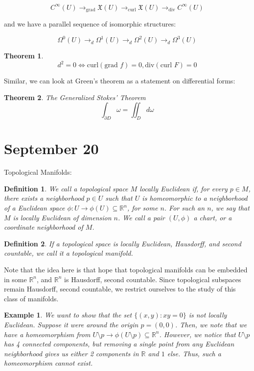 \documentclass[10pt]{article}
\newtheorem{definition}{Definition}[section]
\newtheorem{theorem}{Theorem}[section]
\newtheorem{example}{Example}[section]
\begin{document}
$$ C^\infty(U) \to_{\text{grad}} \mathfrak{X}(U) \to_{\text{curl}} \mathfrak{X}(U) \to_{\text{div}} C^\infty(U) $$

and we have a parallel sequence of isomorphic structures:

$$ \Omega^0(U) \to_d  \Omega^1(U) \to_d  \Omega^2(U) \to_d \Omega^3(U)$$

\begin{theorem}
$$d^2 = 0 \iff \text{curl}(\text{grad } f) = 0, \text{div}(\text{curl } F) = 0 $$
\end{theorem}

Similar, we can look at Green’s theorem as a statement on differential forms:

\begin{theorem}
The Generalized Stokes’ Theorem
$$ \int_{\partial D} \omega = \iint_D d\omega $$
\end{theorem}

\section{September 20}

Topological Manifolds:

\begin{definition}
We call a topological space $M$ locally Euclidean if, for every $p \in M$, there exists a neighborhood $p \in U$ such that $U$ is homeomorphic to a neighborhood of a Euclidean space $\phi: U \to \phi(U) \subseteq \mathbb{R}^n$, for some $n$. For such an $n$, we say that $M$ is locally Euclidean of dimension $n$. We call a pair $(U, \phi)$ a chart, or a coordinate neighborhood of $M$.
\end{definition}

\begin{definition}
If a topological space is locally Euclidean, Hausdorff, and second countable, we call it a topological manifold.
\end{definition}

Note that the idea here is that hope that topological manifolds can be embedded in some $\mathbb{R}^n$, and $\mathbb{R}^n$ is Hausdorff, second countable. Since topological subspaces remain Hausdorff, second countable, we restrict ourselves to the study of this class of manifolds.

\begin{example}
We want to show that the set $\{ (x,y) : xy = 0 \}$ is not locally Euclidean. Suppose it were around the origin $p = (0,0)$. Then, we note that we have a homeomorphism from $U \setminus p \to \phi(U \setminus p) \subseteq \mathbb{R}^n$. However, we notice that $U \setminus p$ has 4 connected components, but removing a single point from any Euclidean neighborhood gives us either 2 components in $\mathbb{R}$ and $1$ else. Thus, such a homeomorphism cannot exist.
\end{example}
\end{document}
